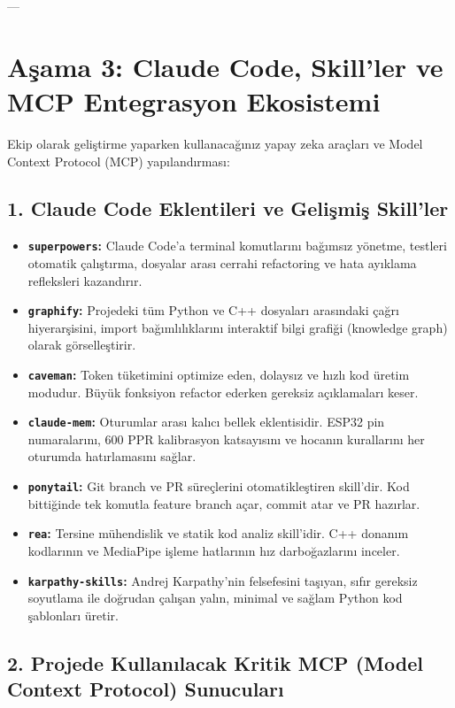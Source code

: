 \documentclass[11pt, a4paper]{article}
\begin{document}
---

\section{Aşama 3: Claude Code, Skill'ler ve MCP Entegrasyon Ekosistemi}

Ekip olarak geliştirme yaparken kullanacağınız yapay zeka araçları ve Model Context Protocol (MCP) yapılandırması:

\subsection{1. Claude Code Eklentileri ve Gelişmiş Skill'ler}

\begin{itemize}[leftmargin=1.5em, itemsep=0.4em]
    \item \textbf{\texttt{superpowers}:} Claude Code'a terminal komutlarını bağımsız yönetme, testleri otomatik çalıştırma, dosyalar arası cerrahi refactoring ve hata ayıklama refleksleri kazandırır.
    \item \textbf{\texttt{graphify}:} Projedeki tüm Python ve C++ dosyaları arasındaki çağrı hiyerarşisini, import bağımlılıklarını interaktif bilgi grafiği (knowledge graph) olarak görselleştirir.
    \item \textbf{\texttt{caveman}:} Token tüketimini optimize eden, dolaysız ve hızlı kod üretim modudur. Büyük fonksiyon refactor ederken gereksiz açıklamaları keser.
    \item \textbf{\texttt{claude-mem}:} Oturumlar arası kalıcı bellek eklentisidir. ESP32 pin numaralarını, 600 PPR kalibrasyon katsayısını ve hocanın kurallarını her oturumda hatırlamasını sağlar.
    \item \textbf{\texttt{ponytail}:} Git branch ve PR süreçlerini otomatikleştiren skill'dir. Kod bittiğinde tek komutla feature branch açar, commit atar ve PR hazırlar.
    \item \textbf{\texttt{rea}:} Tersine mühendislik ve statik kod analiz skill'idir. C++ donanım kodlarının ve MediaPipe işleme hatlarının hız darboğazlarını inceler.
    \item \textbf{\texttt{karpathy-skills}:} Andrej Karpathy'nin felsefesini taşıyan, sıfır gereksiz soyutlama ile doğrudan çalışan yalın, minimal ve sağlam Python kod şablonları üretir.
\end{itemize}

\subsection{2. Projede Kullanılacak Kritik MCP (Model Context Protocol) Sunucuları}
\end{document}
